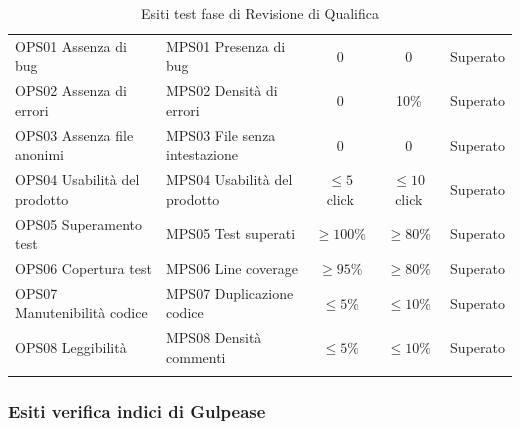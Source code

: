 \documentclass[../piano_di_qualifica.tex]{subfiles}
\begin{document}
\begin{center}
\begin{longtable}{|p{4cm}|p{4cm}|c|c|c|}
		OPS01 Assenza di bug            & MPS01 Presenza di bug         & 0                         & 0                    & Superato       \\
		OPS02 Assenza di errori         & MPS02 Densità di errori       & 0                         & 10\%                 & Superato       \\
		OPS03 Assenza file anonimi      & MPS03 File senza intestazione & 0                         & 0                    & Superato       \\
		OPS04 Usabilità del prodotto    & MPS04 Usabilità del prodotto  & \(\leq5\) click              & \(\leq10\) click     & Superato       \\
		OPS05 Superamento test          & MPS05 Test superati           & \(\ge 100\%\)             & \(\ge 80\%\)         & Superato       \\
		OPS06 Copertura test            & MPS06 Line coverage           & \(\ge 95\%\)              & \(\ge 80\%\)         & Superato       \\
		OPS07 Manutenibilità codice     & MPS07  Duplicazione codice    & \(\leq 5\%\)              & \(\leq 10\%\)        & Superato       \\
		OPS08 Leggibilità               & MPS08 Densità commenti        & \(\leq 5\%\)              & \(\leq 10\%\)        & Superato       \\

		\hline
		\rowcolor{white}
		\caption{Esiti test fase di Revisione di Qualifica}
	\end{longtable}
\end{center}

\subsubsection{Esiti verifica indici di Gulpease}
\label{sub:verif_gul_RQ}
\end{document}
